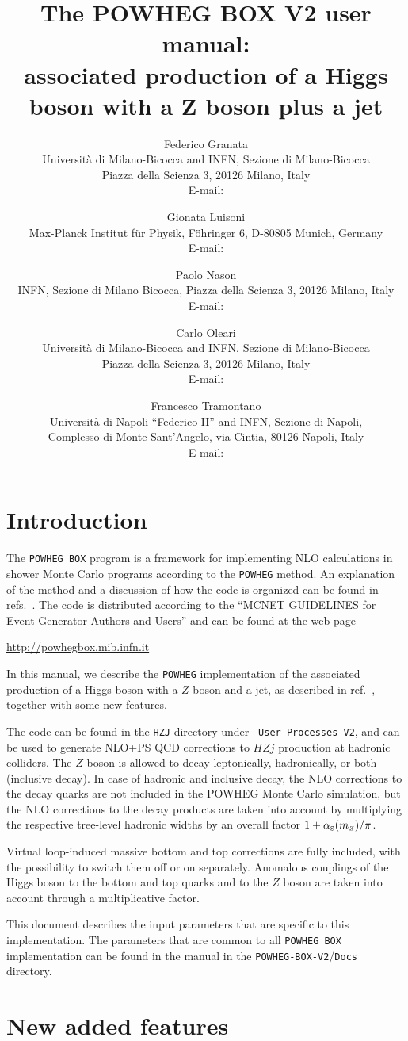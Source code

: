 \documentclass[paper]{JHEP3}
\title{The POWHEG BOX V2 user manual:\\
  associated production of a Higgs boson with a $\boldsymbol{Z}$ boson plus a jet} \vfill
\author{Federico Granata\\
  Universit\`a di Milano-Bicocca and INFN, Sezione di Milano-Bicocca\\
  Piazza della Scienza 3, 20126 Milano, Italy\\
  E-mail: \email{federico.granata@mib.infn.it}}
\author{Gionata Luisoni\\ 
  Max-Planck Institut f{\"u}r Physik, F\"ohringer 6, D-80805 Munich, Germany\\
  E-mail: \email{luisonig@mpp.mpg.de}
}
\author{Paolo Nason\\
  INFN, Sezione di Milano Bicocca, Piazza della Scienza 3, 20126 Milano, Italy\\
  E-mail: \email{paolo.nason@mib.infn.it}
}
\author{Carlo Oleari\\
  Universit\`a di Milano-Bicocca and INFN, Sezione di Milano-Bicocca\\
  Piazza della Scienza 3, 20126 Milano, Italy\\
  E-mail: \email{carlo.oleari@mib.infn.it}}
\author{Francesco Tramontano\\
  Universit\`a di Napoli ``Federico II'' and INFN, Sezione di Napoli,\\
  Complesso di Monte Sant'Angelo, via Cintia, 80126 Napoli, Italy\\
  E-mail: \email{francesco.tramontano@na.infn.it}
}
\newcommand\sss{\mathchoice%
{\displaystyle}%
{\scriptstyle}%
{\scriptscriptstyle}%
{\scriptscriptstyle}%
}
\newcommand\as{\alpha_{\sss\rm S}}
\newcommand\POWHEG{{\tt POWHEG}}
\newcommand\POWHEGBOX{{\tt POWHEG BOX}}
\newcommand\POWHEGBOXV{{\tt POWHEG-BOX-V2}}
\newcommand\HZJ{{\tt HZJ}}
\begin{document}
\section{Introduction}

The \POWHEGBOX{} program is a framework for implementing NLO calculations in
shower Monte Carlo programs according to the \POWHEG{} method. An explanation
of the method and a discussion of how the code is organized can be found in
refs.~\cite{Nason:2004rx,Frixione:2007vw,Alioli:2010xd}.  The code is
distributed according to the ``MCNET GUIDELINES for Event Generator Authors
and Users'' and can be found at the web page
%
\begin{center}
 \url{http://powhegbox.mib.infn.it}
\end{center}
%
In this manual, we describe the \POWHEG{} implementation of the
associated production of a Higgs boson with a $Z$ boson and a jet, as
described in ref.~\cite{Luisoni:2013cuh}, together with some new
features.

The code can be found in the \HZJ{} directory under {\tt
  User-Processes-V2}, and can be used to generate NLO+PS QCD
corrections to $HZj$ production at hadronic colliders.  The $Z$ boson
is allowed to decay leptonically, hadronically, or both (inclusive
decay).  In case of hadronic and inclusive decay, the NLO corrections
to the decay quarks are not included in the POWHEG Monte Carlo
simulation, but the NLO corrections to the decay products are taken
into account by multiplying the respective tree-level hadronic widths
by an overall factor $1+\as(m_{\sss Z})/\pi$.

Virtual loop-induced massive bottom and top corrections are fully included,
with the possibility to switch them off or on separately.  Anomalous
couplings of the Higgs boson to the bottom and top quarks and to the $Z$
boson are taken into account through a multiplicative factor.

This document describes the input parameters that are specific to this
implementation. The parameters that are common to all \POWHEGBOX{}
implementation can be found in the manual in the \POWHEGBOXV{}/{\tt Docs}
directory.




\section{New added features}
\end{document}
